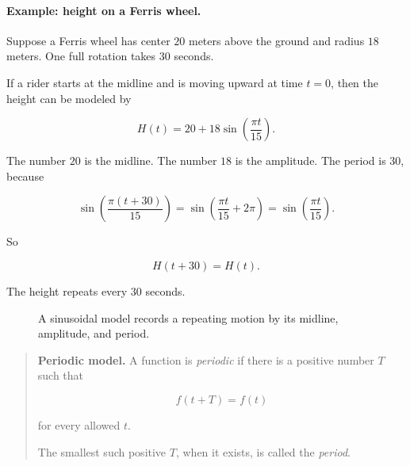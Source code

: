 \paragraph{Example: height on a Ferris wheel.}
Suppose a Ferris wheel has center \(20\) meters above the ground and radius \(18\) meters. One full rotation takes \(30\) seconds.

If a rider starts at the midline and is moving upward at time \(t=0\), then the height can be modeled by

\[
H(t)=20+18\sin\left(\frac{\pi t}{15}\right).
\]

The number \(20\) is the midline. The number \(18\) is the amplitude. The period is \(30\), because

\[
\sin\left(\frac{\pi(t+30)}{15}\right)
=
\sin\left(\frac{\pi t}{15}+2\pi\right)
=
\sin\left(\frac{\pi t}{15}\right).
\]

So

\[
H(t+30)=H(t).
\]

The height repeats every \(30\) seconds.

\begin{figure}[h]
\centering
{}
\caption{A sinusoidal model records a repeating motion by its midline, amplitude, and period.}
\label{fig:ferris-wheel-model}
\end{figure}

\begin{quote}
\textbf{Periodic model.}
A function is \emph{periodic} if there is a positive number \(T\) such that

\[
f(t+T)=f(t)
\]

for every allowed \(t\).

The smallest such positive \(T\), when it exists, is called the \emph{period}.
\end{quote}

